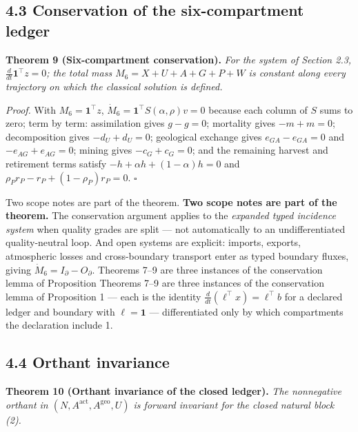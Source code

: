 \documentclass[11pt]{article}
\begin{document}
\subsection*{4.3 Conservation of the six-compartment ledger}\label{43-conservation-of-the-six-compartment-ledger}

\textbf{Theorem 9 (Six-compartment conservation).} \emph{For the system of Section 2.3, \(\frac{d}{dt}\mathbf{1}^\top z =\allowbreak{} 0\); the total mass \(M_6 = X + U + A + G + P + W\) is constant along every trajectory on which the classical solution is defined.}

\emph{Proof.} With \(M_6 = \mathbf{1}^\top z\), \(\dot M_6 =\allowbreak{} \mathbf{1}^\top S(\alpha,\allowbreak{}\rho) v =\allowbreak{} 0\) because each column of \(S\) sums to zero; term by term: assimilation gives \(g - g = 0\); mortality gives \(-m + m = 0\); decomposition gives \(-d_U + d_U = 0\); geological exchange gives \(e_{GA} - e_{GA} = 0\) and \(-e_{AG} + e_{AG} = 0\); mining gives \(-c_G + c_G = 0\); and the remaining harvest and retirement terms satisfy \(-h +\allowbreak{} \alpha h +\allowbreak{} (1-\alpha)h =\allowbreak{} 0\) and \(\rho_P r_P - r_P +\allowbreak{} (1-\rho_P)r_P =\allowbreak{} 0\). \(\square\)

Two scope notes are part of the theorem. \textbf{Two scope notes are part of the theorem.} The conservation argument applies to the \emph{expanded typed incidence system} when quality grades are split --- not automatically to an undifferentiated quality-neutral loop. And open systems are explicit: imports, exports, atmospheric losses and cross-boundary transport enter as typed boundary fluxes, giving \(\dot M_6=\allowbreak{}I_\partial-O_\partial\). Theorems 7--9 are three instances of the conservation lemma of Proposition Theorems 7--9 are three instances of the conservation lemma of Proposition 1 --- each is the identity \(\frac{d}{dt}(\ell^\top x) = \ell^\top b\) for a declared ledger and boundary with \(\ell = \mathbf{1}\) --- differentiated only by which compartments the declaration include 1.

\subsection*{4.4 Orthant invariance}\label{44-orthant-invariance}

\textbf{Theorem 10 (Orthant invariance of the closed ledger).} \emph{The nonnegative orthant in \((N,\allowbreak{} A^{\mathrm{act}},\allowbreak{} A^{\mathrm{geo}},\allowbreak{} U)\) is forward invariant for the closed natural block (2).}
\end{document}
